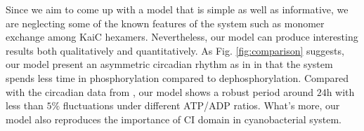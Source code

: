 \documentclass[a4paper,10pt]{article}
\numberwithin{equation}{section}
\begin{document}


Since we aim to come up with a model that is simple as well as informative, we are neglecting some of the known features of the system such as monomer exchange among KaiC hexamers. Nevertheless, our model can produce interesting results both qualitatively and quantitatively.  As Fig. \ref{fig:comparison} suggests, our model present an asymmetric circadian rhythm as in \citet{rust809} in that the system spends less time in phosphorylation compared to dephosphorylation.  Compared with the circadian data from \citet{phong2012},  our model shows a robust period around $24$h with less than $5\%$ fluctuations under different ATP/ADP ratios. What's more, our model also reproduces the importance of CI domain in cyanobacterial system. 

\end{document}
